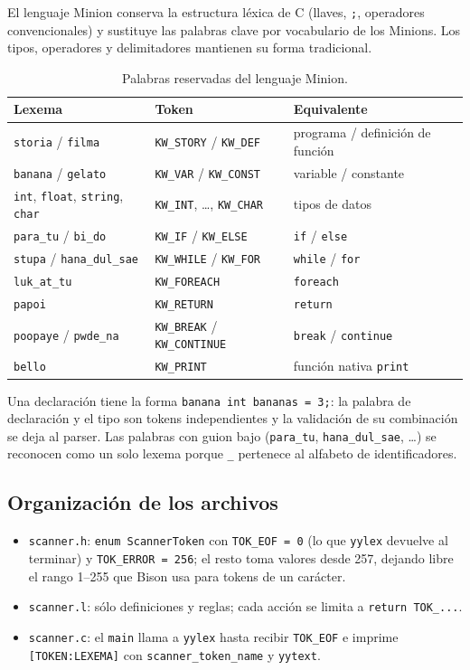 \documentclass[11pt,letterpaper]{article}
\newcommand{\code}[1]{\texttt{#1}}
\begin{document}
El lenguaje Minion conserva la estructura léxica de C (llaves, \code{;}, operadores convencionales) y sustituye las palabras clave por vocabulario de los Minions. Los tipos, operadores y delimitadores mantienen su forma tradicional.

\begin{table}[H]
\centering\footnotesize
\begin{tabular}{lll}
\toprule
\textbf{Lexema} & \textbf{Token} & \textbf{Equivalente} \\
\midrule
\code{storia} / \code{filma} & \code{KW\_STORY} / \code{KW\_DEF} & programa / definición de función \\
\code{banana} / \code{gelato} & \code{KW\_VAR} / \code{KW\_CONST} & variable / constante \\
\code{int}, \code{float}, \code{string}, \code{char} & \code{KW\_INT}, \dots, \code{KW\_CHAR} & tipos de datos \\
\code{para\_tu} / \code{bi\_do} & \code{KW\_IF} / \code{KW\_ELSE} & \code{if} / \code{else} \\
\code{stupa} / \code{hana\_dul\_sae} & \code{KW\_WHILE} / \code{KW\_FOR} & \code{while} / \code{for} \\
\code{luk\_at\_tu} & \code{KW\_FOREACH} & \code{foreach} \\
\code{papoi} & \code{KW\_RETURN} & \code{return} \\
\code{poopaye} / \code{pwde\_na} & \code{KW\_BREAK} / \code{KW\_CONTINUE} & \code{break} / \code{continue} \\
\code{bello} & \code{KW\_PRINT} & función nativa \code{print} \\
\bottomrule
\end{tabular}
\caption{Palabras reservadas del lenguaje Minion.}
\end{table}

Una declaración tiene la forma \code{banana int bananas = 3;}: la palabra de declaración y el tipo son tokens independientes y la validación de su combinación se deja al parser. Las palabras con guion bajo (\code{para\_tu}, \code{hana\_dul\_sae}, \dots) se reconocen como un solo lexema porque \code{\_} pertenece al alfabeto de identificadores.

\subsection{Organización de los archivos}

\begin{itemize}
  \item \code{scanner.h}: \code{enum ScannerToken} con \code{TOK\_EOF = 0} (lo que \code{yylex} devuelve al terminar) y \code{TOK\_ERROR = 256}; el resto toma valores desde 257, dejando libre el rango 1--255 que Bison usa para tokens de un carácter.
  \item \code{scanner.l}: sólo definiciones y reglas; cada acción se limita a \code{return TOK\_...}.
  \item \code{scanner.c}: el \code{main} llama a \code{yylex} hasta recibir \code{TOK\_EOF} e imprime \code{[TOKEN:LEXEMA]} con \code{scanner\_token\_name} y \code{yytext}.
\end{itemize}
\end{document}
